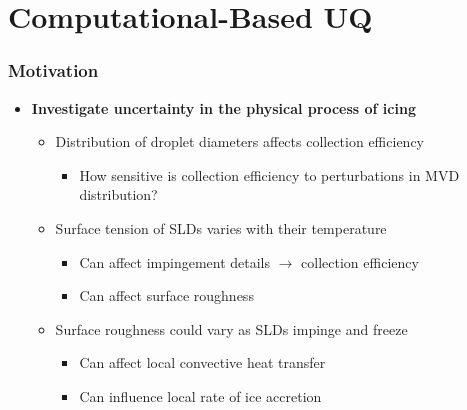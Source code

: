 \documentclass[9pt]{beamer}
\begin{document}
\section{Computational-Based UQ}
\label{sec-5}
\begin{frame}
\frametitle{Motivation}
\label{sec-5-1}

\begin{itemize}
\item \textbf{Investigate uncertainty in the physical process of icing}
\begin{itemize}
\item Distribution of droplet diameters affects collection efficiency
\begin{itemize}
\item How sensitive is collection efficiency to perturbations in MVD distribution?
\end{itemize}
\item Surface tension of SLDs varies with their temperature
\begin{itemize}
\item Can affect impingement details $\rightarrow$ collection efficiency
\item Can affect surface roughness
\end{itemize}
\item Surface roughness could vary as SLDs impinge and freeze
\begin{itemize}
\item Can affect local convective heat transfer
\item Can influence local rate of ice accretion
\end{itemize}
\end{itemize}
\end{itemize}
\end{frame}
\end{document}
